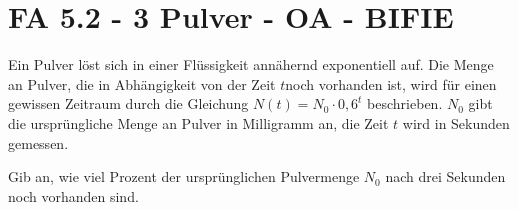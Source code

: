 \section{FA 5.2 - 3 Pulver - OA - BIFIE}

\begin{beispiel}[FA 5.2]{1} %
Ein Pulver löst sich in einer Flüssigkeit annähernd exponentiell auf. Die Menge an Pulver, die in
Abhängigkeit von der Zeit $t $noch vorhanden ist, wird für einen gewissen Zeitraum durch die
Gleichung $N(t) = N_0 \cdot 0,6^t$ beschrieben. $N_0$ gibt die ursprüngliche Menge an Pulver in Milligramm
an, die Zeit $t$ wird in Sekunden gemessen. 

\leer

Gib an, wie viel Prozent der ursprünglichen Pulvermenge $N_0$ nach drei Sekunden noch vorhanden sind.  

\end{beispiel}